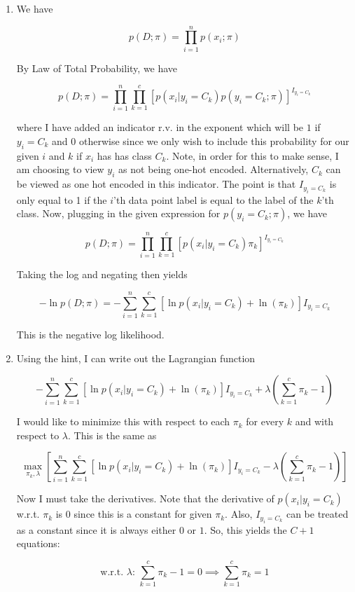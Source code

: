 \documentclass[submit]{harvardml}
\begin{document}
\begin{enumerate}
    \item We have
    
    $$p(D;\pi) = \prod_{i=1}^n p(x_i ; \pi)$$
    
    By Law of Total Probability, we have
    
    $$p(D;\pi) = \prod_{i=1}^n \prod_{k=1}^c [p(x_i |y_i = C_k) p(y_i =C_k ; \pi)] ^{I_{y_i=C_k}} $$
    
    where I have added an indicator r.v. in the exponent which will be $1$ if $y_i=C_k$ and $0$ otherwise since we only wish to include this probability for our given $i$ and $k$ if $x_i$ has has class $C_k$. Note, in order for this to make sense, I am choosing to view $y_i$ as not being one-hot encoded. Alternatively, $C_k$ can be viewed as one hot encoded in this indicator. The point is that $I_{y_i=C_k}$ is only equal to 1 if the $i$'th data point label is equal to the label of the $k$'th class. Now, plugging in the given expression for $p(y_i =C_k ; \pi)$, we have
    
    $$p(D;\pi) = \prod_{i=1}^n \prod_{k=1}^c [p(x_i |y_i = C_k) \pi_k] ^{I_{y_i=C_k}} $$
    
    Taking the log and negating then yields 
    
    $$\boxed{- \ln p(D;\pi) = -\sum_{i=1}^n \sum_{k=1}^c [ \ln p(x_i |y_i = C_k) +\ln(\pi_k)] I_{y_i=C_k}} $$
    
    This is the negative log likelihood.
    \item Using the hint, I can write out the Lagrangian function
    
    $$ -\sum_{i=1}^n \sum_{k=1}^c [ \ln p(x_i |y_i = C_k) +\ln(\pi_k)] I_{y_i=C_k} + \lambda(\sum_{k=1}^c \pi_k -1) $$
    
    I would like to minimize this with respect to each $\pi_k$ for every $k$ and with respect to $\lambda$. This is the same as
    
    $$ \max_{\pi_k,\lambda} [\sum_{i=1}^n \sum_{k=1}^c [ \ln p(x_i |y_i = C_k) +\ln(\pi_k)] I_{y_i=C_k} - \lambda(\sum_{k=1}^c \pi_k -1)] $$
    
    Now I must take the derivatives. Note that the derivative of $p(x_i |y_i = C_k)$ w.r.t. $\pi_k$ is $0$ since this is a constant for given $\pi_k$. Also, $I_{y_i=C_k}$ can be treated as a constant since it is always either $0$ or $1$. So, this yields the $C + 1$ equations:
    
    $$ \textrm{w.r.t. $\lambda$: }\sum_{k=1}^c \pi_k -1 = 0 \implies \sum_{k=1}^c \pi_k =1 $$
    

\end{enumerate}
\end{document}
